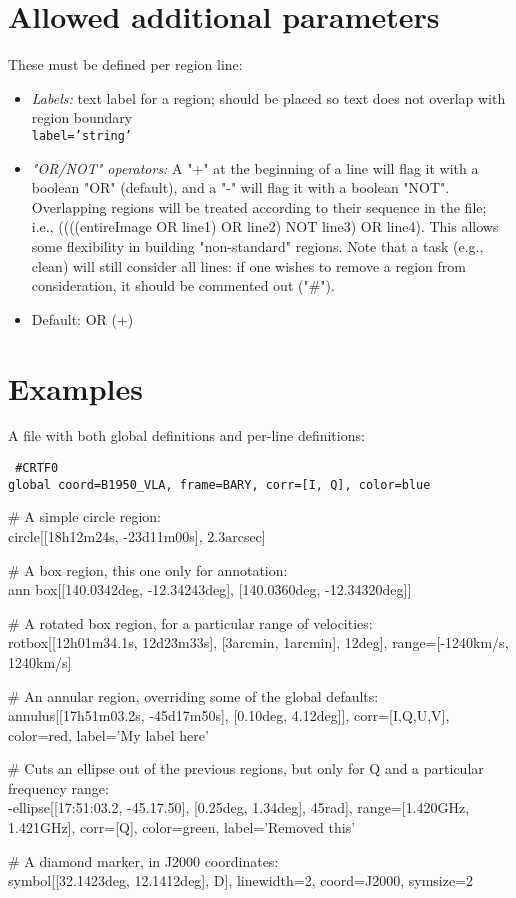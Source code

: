 \section{Allowed additional parameters}

These must be defined per region line:

\begin{itemize}

\item {\it Labels:} text label for a region; should be placed so text
  does not overlap with region boundary\\

{\tt label='string'}

\item {\it "OR/NOT" operators:} A "+" at the beginning of a line will
  flag it with a boolean "OR" (default), and a "-" will flag it with a
  boolean "NOT".  Overlapping regions will be treated according to
  their sequence in the file; i.e., ((((entireImage OR line1) OR
  line2) NOT line3) OR line4).  This allows some flexibility in
  building "non-standard" regions.  Note that a task (e.g., clean)
  will still consider all lines: if one wishes to remove a region from
  consideration, it should be commented out ("\#").

\item Default: OR (+)

\end{itemize}

\section{Examples}

A file with both global definitions and per-line definitions:

{\tt
\#CRTF0\\
global coord=B1950\_VLA, frame=BARY, corr=[I, Q], color=blue

\# A simple circle region:\\
circle[[18h12m24s, -23d11m00s], 2.3arcsec]

\# A box region, this one only for annotation:\\
ann box[[140.0342deg, -12.34243deg], [140.0360deg, -12.34320deg]]

\# A rotated box region, for a particular range of velocities:\\
rotbox[[12h01m34.1s, 12d23m33s], [3arcmin, 1arcmin], 12deg], range=[-1240km/s, 1240km/s]

\# An annular region, overriding some of the global defaults:\\
annulus[[17h51m03.2s, -45d17m50s], [0.10deg, 4.12deg]], corr=[I,Q,U,V], color=red, label='My label here'

\# Cuts an ellipse out of the previous regions, but only for Q and a particular frequency range:\\
-ellipse[[17:51:03.2, -45.17.50], [0.25deg, 1.34deg], 45rad], range=[1.420GHz, 1.421GHz], corr=[Q], color=green, label='Removed this'

\# A diamond marker, in J2000 coordinates:\\
symbol[[32.1423deg, 12.1412deg], D], linewidth=2, coord=J2000, symsize=2

}

